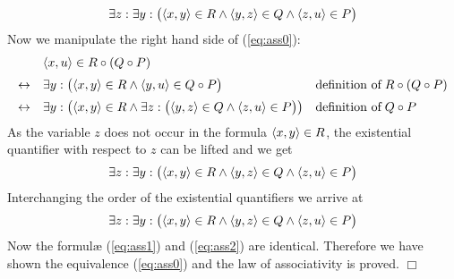 \begin{equation}
  \label{eq:ass1}
  \exists z: \exists y: \bigl(\pair(x,y) \in R \wedge \pair(y,z) \in Q \wedge \pair(z,u) \in P\bigr)
\end{equation}
Now we manipulate the right hand side of (\ref{eq:ass0}):
\[
\begin{array}{cll}
                & \pair(x,u) \in R \circ (Q \circ P) \\[0.2cm] 
\leftrightarrow & \exists y: \bigl(\pair(x,y) \in R \wedge \pair (y,u) \in Q \circ P\bigr) &
                  \mbox{definition of}\; R \circ (Q \circ P) \\[0.2cm]
\leftrightarrow & \exists y: \bigl(\pair(x,y) \in R \wedge 
                  \exists z: \bigl(\pair(y,z) \in Q \wedge \pair(z,u) \in P\bigr)\bigr) &
                  \mbox{definition of}\; Q \circ P \\
\end{array}
\]
As the variable  $z$ does not occur in the formula $\pair(x,y) \in R$, the existential
quantifier with respect to $z$ can be lifted and we get
\begin{equation}
  \exists z: \exists y: \bigl(\pair(x,y) \in R \wedge \pair(y,z) \in Q \wedge \pair(z,u) \in P\bigr)
\end{equation}
Interchanging the order of the existential quantifiers we arrive at
\begin{equation}
  \label{eq:ass2}
  \exists z: \exists y: \bigl(\pair(x,y) \in R \wedge \pair(y,z) \in Q \wedge \pair(z,u) \in P\bigr)
\end{equation}
Now the  {formul\ae} (\ref{eq:ass1}) and (\ref{eq:ass2}) are identical.  Therefore we have
shown the equivalence
(\ref{eq:ass0}) and the law of associativity is proved.  \hspace*{\fill} $\Box$
\vspace{0.2cm}

